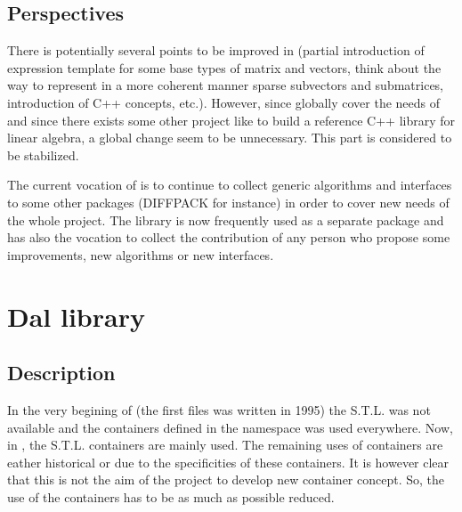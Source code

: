 \documentclass[a4paper,11pt,english]{sphinxmanual}
\begin{document}
\subsection{Perspectives}
\label{\detokenize{project/libdesc_gmm:perspectives}}
There is potentially several points to be improved in  (partial
introduction of expression template for some base types of matrix and vectors,
think about the way to represent in a more coherent manner sparse sub\sphinxhyphen{}vectors
and sub\sphinxhyphen{}matrices, introduction of C++ concepts, etc.). However, since 
globally cover the needs of  and since there exists some other project like
 to build a reference C++ library for
linear algebra, a global change seem to be unnecessary. This part
is considered to be stabilized.

The current vocation of  is to continue to collect generic algorithms and
interfaces to some other packages (DIFFPACK for instance) in order to cover new needs of the whole
project. The library is now frequently used as a separate package and has also
the vocation to collect the contribution of any person who propose some
improvements, new algorithms or new interfaces.


\section{Dal library}
\label{\detokenize{project/libdesc_dal:dal-library}}\label{\detokenize{project/libdesc_dal:dp-libdesc-dal}}\label{\detokenize{project/libdesc_dal::doc}}

\subsection{Description}
\label{\detokenize{project/libdesc_dal:description}}
In the very begining of  (the first files was written in 1995) the S.T.L. was
not available and the containers defined in the  namespace was used
everywhere. Now, in , the S.T.L. containers are mainly used. The remaining
uses of  containers are eather historical or due to the specificities of
these containers. It is however clear that this is not the aim of the 
project to develop new container concept. So, the use of the  containers
has to be as much as possible reduced.
\end{document}
